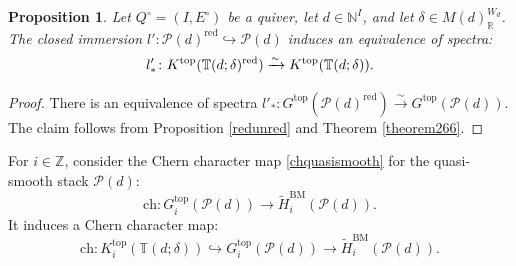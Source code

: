 \documentclass [11pt,oneside,a4paper,mathscr]{amsart}
\newtheorem{prop}[thm]{Proposition}
\theoremstyle{definition}
\newcommand{\X}{\mathscr{X}}
\begin{document}
\begin{prop}\label{prop71}
Let $Q^\circ=(I, E^\circ)$ be a quiver, let $d\in \mathbb{N}^I$, and let $\delta\in M(d)^{W_d}_\mathbb{R}$.
    The closed immersion $l'\colon \mathscr{P}(d)^{\mathrm{red}}\hookrightarrow \mathscr{P}(d)$ induces an equivalence of spectra:
    \[l'_*\colon K^{\rm{top}}(\mathbb{T}(d; \delta)^{\mathrm{red}})\xrightarrow{\sim} K^{\rm{top}}(\mathbb{T}(d; \delta)).\]
\end{prop}
\begin{proof}
    There is an equivalence of spectra $l'_*\colon G^{\mathrm{top}}(\mathscr{P}(d)^{\mathrm{red}})\xrightarrow{\sim} G^{\mathrm{top}}(\mathscr{P}(d))$. The claim follows from Proposition \ref{redunred} and Theorem \ref{theorem266}.
\end{proof}

%


For $i\in\mathbb{Z}$, consider the Chern character map \eqref{chquasismooth} for the quasi-smooth stack $\mathscr{P}(d)$:
\begin{equation}\label{chpd}
    \mathrm{ch}\colon G^{\mathrm{top}}_i\left(\mathscr{P}(d)\right)\to \widetilde{H}^{\mathrm{BM}}_i(\mathscr{P}(d)).
\end{equation}
It induces a Chern character map: 
\begin{equation}\label{chtdv}
    \mathrm{ch}\colon K^{\mathrm{top}}_i(\mathbb{T}(d; \delta))\hookrightarrow G^{\mathrm{top}}_i\left(\mathscr{P}(d)\right)\to \widetilde{H}^{\mathrm{BM}}_i(\mathscr{P}(d)).
\end{equation}
\end{document}
